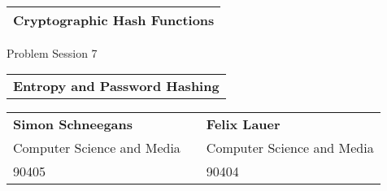 \thispagestyle{empty}
\ \\[3cm]
\begin{tabular}[b]{l}
    \Huge \textbf{Cryptographic Hash Functions} \hspace{12.5cm} \\[1mm]
    \hline
\end{tabular}

\begin{flushright}
    {\large Problem Session 7} \\[8cm]
\end{flushright}

\begin{tabular}[b]{l}
    \LARGE \textbf{Entropy and Password Hashing} \\[4cm]
\end{tabular}

\begin{tabular}{lcl}
    \textbf{Simon Schneegans} &\hspace{1cm} & \textbf{Felix Lauer} \\
    Computer Science and Media & \hspace{1cm}  & Computer Science and Media\\
    90405  &\hspace{1cm} & 90404 \\[1.5cm]
\end{tabular}

\newpage

